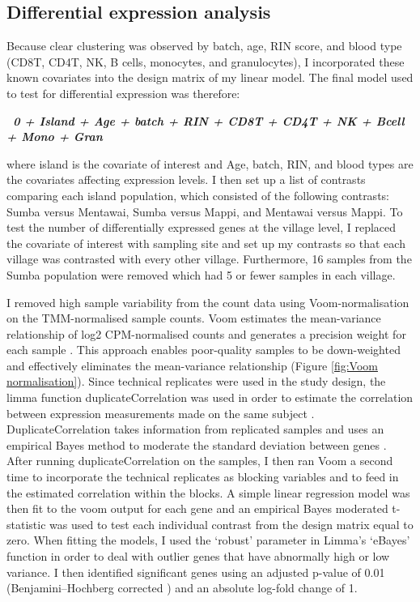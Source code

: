 \documentclass[12pt,a4paper,titlepage,twoside,openright]{book}
\begin{document}
\begin{mainmatter}
{\section{Differential expression analysis}
Because clear clustering was observed by batch, age, RIN score, and blood type (CD8T, CD4T, NK, B cells, monocytes, and granulocytes), I incorporated these known covariates into the design matrix of my linear model. The final model used to test for differential expression was therefore:

\textbf{\textit{~0 + Island + Age + batch + RIN + CD8T + CD4T + NK + Bcell + Mono + Gran}}

where island is the covariate of interest and Age, batch, RIN, and blood types are the covariates affecting expression levels. I then set up a list of contrasts comparing each island population, which consisted of the following contrasts: Sumba versus Mentawai, Sumba versus Mappi, and Mentawai versus Mappi. To test the number of differentially expressed genes at the village level, I replaced the covariate of interest with sampling site and set up my contrasts so that each village was contrasted with every other village. Furthermore, 16 samples from the Sumba population were removed which had 5 or fewer samples in each village. 
  
I removed high sample variability from the count data using Voom-normalisation on the TMM-normalised sample counts. Voom estimates the mean-variance relationship of log2 CPM-normalised counts and generates a precision weight for each sample \cite{law2014voom}. This approach enables poor-quality samples to be down-weighted and effectively eliminates the mean-variance relationship (﻿Figure \ref{fig:Voom normalisation}). Since technical replicates were used in the study design, the limma function duplicateCorrelation was used in order to estimate the correlation between expression measurements made on the same subject \cite{smyth2003limma}. DuplicateCorrelation takes information from replicated samples and uses an empirical Bayes method to moderate the standard deviation between genes \cite{smyth2003limma}. After running duplicateCorrelation on the samples, I then ran Voom a second time to incorporate the technical replicates as blocking variables and to feed in the estimated correlation within the blocks. A simple linear regression model was then fit to the voom output for each gene and an empirical Bayes moderated t-statistic was used to test each individual contrast from the design matrix equal to zero. When fitting the models, I used the ‘robust’ parameter in Limma’s ‘eBayes’ function in order to deal with outlier genes that have abnormally high or low variance. I then identified significant genes using an adjusted p-value of 0.01 (Benjamini–Hochberg corrected \cite{benjamini1995controlling}) and an absolute log-fold change of 1. 

}
\end{mainmatter}
\end{document}
